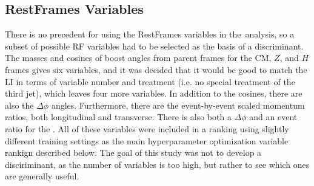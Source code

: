 \subsection{RestFrames Variables}
There is no precedent for using the RestFrames variables in the \ZH\,analysis, so a subset of possible RF variables had to be selected as the basis of a discriminant.  The masses and cosines of boost angles from parent frames for the CM, $Z$, and $H$ frames gives six variables, and it was decided that it would be good to match the LI in terms of variable number and treatment (i.e. no special treatment of the third jet), which leaves four more variables.  In addition to the cosines, there are also the $\Delta\phi$ angles.  Furthermore, there are the event-by-event scaled momentum ratios, both longitudinal and transverse.  There is also both a $\Delta\phi$ and an event ratio for the \met.  All of these variables were included in a ranking using slightly different training settings as the main hyperparameter optimization variable rankign described below.  The goal of this study was not to develop a disciriminant, as the number of variables is too high, but rather to see which ones are generally useful.  
